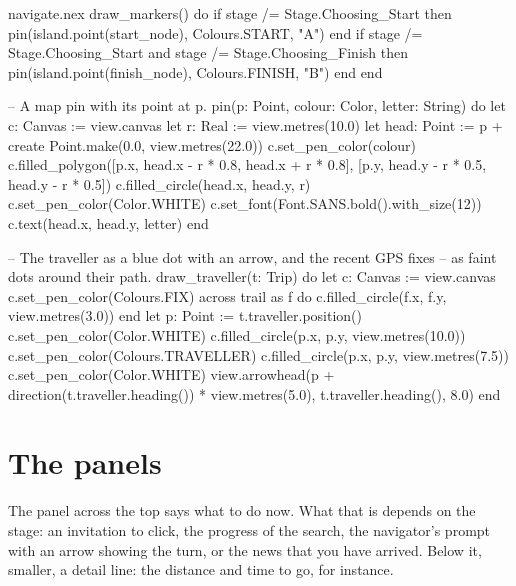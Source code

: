 \begin{continued}{navigate.nex}
  draw_markers() do
    if stage /= Stage.Choosing_Start then
      pin(island.point(start_node), Colours.START, "A")
    end
    if stage /= Stage.Choosing_Start and stage /= Stage.Choosing_Finish then
      pin(island.point(finish_node), Colours.FINISH, "B")
    end
  end

  -- A map pin with its point at p.
  pin(p: Point, colour: Color, letter: String) do
    let c: Canvas := view.canvas
    let r: Real := view.metres(10.0)
    let head: Point := p + create Point.make(0.0, view.metres(22.0))
    c.set_pen_color(colour)
    c.filled_polygon([p.x, head.x - r * 0.8, head.x + r * 0.8],
      [p.y, head.y - r * 0.5, head.y - r * 0.5])
    c.filled_circle(head.x, head.y, r)
    c.set_pen_color(Color.WHITE)
    c.set_font(Font.SANS.bold().with_size(12))
    c.text(head.x, head.y, letter)
  end

  -- The traveller as a blue dot with an arrow, and the recent GPS fixes
  -- as faint dots around their path.
  draw_traveller(t: Trip) do
    let c: Canvas := view.canvas
    c.set_pen_color(Colours.FIX)
    across trail as f do
      c.filled_circle(f.x, f.y, view.metres(3.0))
    end
    let p: Point := t.traveller.position()
    c.set_pen_color(Color.WHITE)
    c.filled_circle(p.x, p.y, view.metres(10.0))
    c.set_pen_color(Colours.TRAVELLER)
    c.filled_circle(p.x, p.y, view.metres(7.5))
    c.set_pen_color(Color.WHITE)
    view.arrowhead(p + direction(t.traveller.heading()) * view.metres(5.0),
      t.traveller.heading(), 8.0)
  end
\end{continued}

\section{The panels}

The panel across the top says what to do now. What that is depends on the
stage: an invitation to click, the progress of the search, the navigator's
prompt with an arrow showing the turn, or the news that you have arrived.
Below it, smaller, a detail line: the distance and time to go, for
instance.

